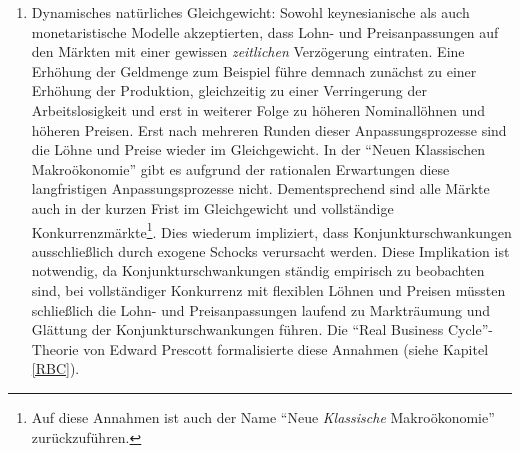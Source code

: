 \begin{enumerate}
	Diese beiden Beispiele zeigen den enormen Nebeneffekt der Rationalen Erwartungen: Nämlich, dass weder Fiskalpolitik noch Geldpolitik\footnote{Nur wenn die politischen Handlungen absolut unvorhergesehen erfolgen, können damit kurzfristig die erwünschten Effekt eintreten.}, einen stabilisierenden Einfluss auf die gesamtwirtschaftliche Entwicklung haben \parencite{Sargent1975, Barro1976}. Wirtschaftspolitik \textit{steuert} nicht länger die ökonomische Entwicklung, sondern ist nur ein \textit{Player} in einem Spiel zwischen Politik und den Markteilnehmern \parencite{Kydland1977}. Dies brachte die Spieltheorie in die Makroökonomie, was ebenfalls dem Zeitgeist entsprach und die Neue Klassische Makroökonomie noch "`sexier"' machte.	
	Abgesehen davon ist dies aber natürlich auch der absolute Bruch mit den Lehren des Keynesianismus.
	Die Wirkungslosigkeit jeglicher damals bekannter wirtschaftspolitischer Elemente, führt uns direkt zum zweiten wesentlichen Punkt der Neuen Klassischen Makroökonomie.
	
	\item Dynamisches natürliches Gleichgewicht: Sowohl keynesianische als auch monetaristische Modelle akzeptierten, dass Lohn- und Preisanpassungen auf den Märkten mit einer gewissen \textit{zeitlichen} Verzögerung eintraten. Eine Erhöhung der Geldmenge zum Beispiel führe demnach zunächst zu einer Erhöhung der Produktion, gleichzeitig zu einer Verringerung der Arbeitslosigkeit und erst in weiterer Folge zu höheren Nominallöhnen und höheren Preisen. Erst nach mehreren Runden dieser Anpassungsprozesse sind die Löhne und Preise wieder im Gleichgewicht.
	In der "`Neuen Klassischen Makroökonomie"' gibt es aufgrund der rationalen Erwartungen diese langfristigen Anpassungsprozesse nicht. Dementsprechend sind alle Märkte auch in der kurzen Frist im Gleichgewicht und vollständige Konkurrenzmärkte\footnote{Auf diese Annahmen ist auch der Name "`Neue \textit{Klassische} Makroökonomie"' zurückzuführen.}. 
	Dies wiederum impliziert, dass Konjunkturschwankungen ausschließlich durch exogene Schocks verursacht werden. Diese Implikation ist notwendig, da Konjunkturschwankungen ständig empirisch zu beobachten sind, bei vollständiger Konkurrenz mit flexiblen Löhnen und Preisen müssten schließlich die Lohn- und Preisanpassungen laufend zu Markträumung und Glättung der Konjunkturschwankungen führen. Die "`Real Business Cycle"'-Theorie von Edward Prescott formalisierte diese Annahmen (siehe Kapitel \ref{RBC}).
	

\end{enumerate}
